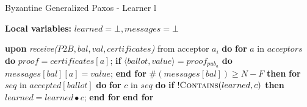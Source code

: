 \begin{algorithm}
	\caption{Byzantine Generalized Paxos - Learner l}
	\label{BFT-Learn}
	\textbf{Local variables: } $learned = \bot, messages = \bot$ 
	\begin{algorithmic}[1]
		\State \textbf{upon} \textit{receive($P2B, bal, val, certificates$)} from acceptor $a_i$ \textbf{do}
		\State \hspace{\algorithmicindent} \textbf{for} $a$ in $acceptors$ \textbf{do} 
		\State \hspace{\algorithmicindent}\hspace{\algorithmicindent} $proof = certificates[a]$;
		\State \hspace{\algorithmicindent}\hspace{\algorithmicindent} \textbf{if} $\langle ballot, value \rangle = proof_{pub_a}$ \textbf{do}
		\State \hspace{\algorithmicindent}\hspace{\algorithmicindent}\hspace{\algorithmicindent} $messages[bal][a] = value$;
		\State \hspace{\algorithmicindent} \textbf{end for}
		\State
		\State \hspace{\algorithmicindent} $\#(messages[bal]) \geq N-F$ \textbf{then}
		\State \hspace{\algorithmicindent}\hspace{\algorithmicindent} \textbf{for} $seq$ in $accepted[ballot]$ \textbf{do}
		\State \hspace{\algorithmicindent}\hspace{\algorithmicindent}\hspace{\algorithmicindent} \textbf{for} $c$ in $seq$ \textbf{do} 
		\State \hspace{\algorithmicindent}\hspace{\algorithmicindent}\hspace{\algorithmicindent}\hspace{\algorithmicindent} \textbf{if} $!\Call{Contains}{learned,c}$ \textbf{then}
		\State \hspace{\algorithmicindent}\hspace{\algorithmicindent}\hspace{\algorithmicindent}\hspace{\algorithmicindent}\hspace{\algorithmicindent} $learned =  learned \bullet c$;
		\State \hspace{\algorithmicindent}\hspace{\algorithmicindent}\hspace{\algorithmicindent} \textbf{end for}
		\State \hspace{\algorithmicindent}\hspace{\algorithmicindent} \textbf{end for}
		
	\end{algorithmic}
\end{algorithm}